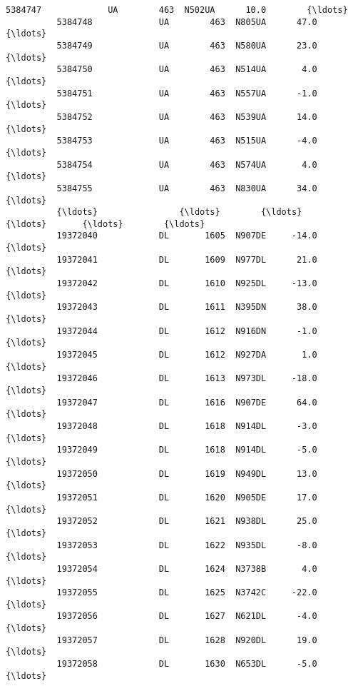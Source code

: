 \documentclass[11pt]{article}
\begin{document}
\begin{Verbatim}[commandchars=\\\{\}]
          5384747             UA        463  N502UA      10.0        {\ldots}           
          5384748             UA        463  N805UA      47.0        {\ldots}           
          5384749             UA        463  N580UA      23.0        {\ldots}           
          5384750             UA        463  N514UA       4.0        {\ldots}           
          5384751             UA        463  N557UA      -1.0        {\ldots}           
          5384752             UA        463  N539UA      14.0        {\ldots}           
          5384753             UA        463  N515UA      -4.0        {\ldots}           
          5384754             UA        463  N574UA       4.0        {\ldots}           
          5384755             UA        463  N830UA      34.0        {\ldots}           
          {\ldots}                {\ldots}        {\ldots}     {\ldots}       {\ldots}        {\ldots}           
          19372040            DL       1605  N907DE     -14.0        {\ldots}           
          19372041            DL       1609  N977DL      21.0        {\ldots}           
          19372042            DL       1610  N925DL     -13.0        {\ldots}           
          19372043            DL       1611  N395DN      38.0        {\ldots}           
          19372044            DL       1612  N916DN      -1.0        {\ldots}           
          19372045            DL       1612  N927DA       1.0        {\ldots}           
          19372046            DL       1613  N973DL     -18.0        {\ldots}           
          19372047            DL       1616  N907DE      64.0        {\ldots}           
          19372048            DL       1618  N914DL      -3.0        {\ldots}           
          19372049            DL       1618  N914DL      -5.0        {\ldots}           
          19372050            DL       1619  N949DL      13.0        {\ldots}           
          19372051            DL       1620  N905DE      17.0        {\ldots}           
          19372052            DL       1621  N938DL      25.0        {\ldots}           
          19372053            DL       1622  N935DL      -8.0        {\ldots}           
          19372054            DL       1624  N3738B       4.0        {\ldots}           
          19372055            DL       1625  N3742C     -22.0        {\ldots}           
          19372056            DL       1627  N621DL      -4.0        {\ldots}           
          19372057            DL       1628  N920DL      19.0        {\ldots}           
          19372058            DL       1630  N653DL      -5.0        {\ldots}           

\end{Verbatim}
\end{document}
